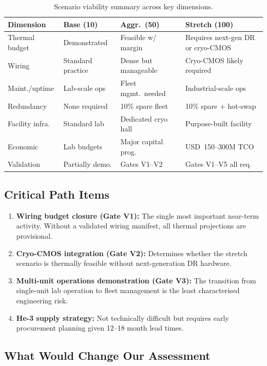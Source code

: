 \documentclass[conference]{IEEEtran}
\begin{document}
\begin{table}[H]
\centering
\caption{Scenario viability summary across key dimensions.}
\label{tab:viability}
\footnotesize
\begin{tabularx}{\columnwidth}{L{1.5cm}L{1.8cm}L{1.8cm}L{1.8cm}}
\toprule
\textbf{Dimension} & \textbf{Base (10)} & \textbf{Aggr.\ (50)} & \textbf{Stretch (100)} \\
\midrule
Thermal budget & Demonstrated & Feasible w/ margin & Requires next-gen DR or cryo-CMOS \\
Wiring & Standard practice & Dense but manageable & Cryo-CMOS likely required \\
Maint./uptime & Lab-scale ops & Fleet mgmt.\ needed & Industrial-scale ops \\
Redundancy & None required & 10\% spare fleet & 10\% spare + hot-swap \\
Facility infra. & Standard lab & Dedicated cryo hall & Purpose-built facility \\
Economic & Lab budgets & Major capital prog. & USD~150--300M TCO \\
Validation & Partially demo. & Gates V1--V2 & Gates V1--V5 all req. \\
\bottomrule
\end{tabularx}
\end{table}

\subsection{Critical Path Items}

\begin{enumerate}
\item \textbf{Wiring budget closure (Gate V1):} The single most important near-term activity. Without a validated wiring manifest, all thermal projections are provisional.
\item \textbf{Cryo-CMOS integration (Gate V2):} Determines whether the stretch scenario is thermally feasible without next-generation DR hardware.
\item \textbf{Multi-unit operations demonstration (Gate V3):} The transition from single-unit lab operation to fleet management is the least characterised engineering risk.
\item \textbf{He-3 supply strategy:} Not technically difficult but requires early procurement planning given 12--18 month lead times.
\end{enumerate}

\subsection{What Would Change Our Assessment}
\end{document}
